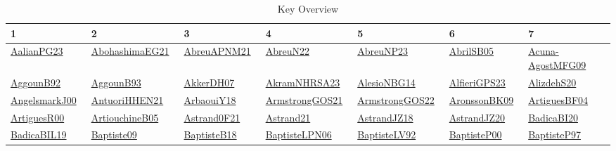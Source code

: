 {\scriptsize
\begin{longtable}{*{7}{l}}
\caption{Key Overview}\\ \toprule
1 & 2 & 3 & 4 & 5 & 6 & 7\\ \midrule
\endhead
\bottomrule
\endfoot
\href{papers/AalianPG23.pdf}{AalianPG23}~\cite{AalianPG23} & \href{articles/AbohashimaEG21.pdf}{AbohashimaEG21}~\cite{AbohashimaEG21} & \href{}{AbreuAPNM21}~\cite{AbreuAPNM21} & \href{articles/AbreuN22.pdf}{AbreuN22}~\cite{AbreuN22} & \href{}{AbreuNP23}~\cite{AbreuNP23} & \href{papers/AbrilSB05.pdf}{AbrilSB05}~\cite{AbrilSB05} & \href{papers/Acuna-AgostMFG09.pdf}{Acuna-AgostMFG09}~\cite{Acuna-AgostMFG09}\\ 
\href{}{AggounB92}~\cite{AggounB92} & \href{articles/AggounB93.pdf}{AggounB93}~\cite{AggounB93} & \href{papers/AkkerDH07.pdf}{AkkerDH07}~\cite{AkkerDH07} & \href{articles/AkramNHRSA23.pdf}{AkramNHRSA23}~\cite{AkramNHRSA23} & \href{papers/AlesioNBG14.pdf}{AlesioNBG14}~\cite{AlesioNBG14} & \href{articles/AlfieriGPS23.pdf}{AlfieriGPS23}~\cite{AlfieriGPS23} & \href{}{AlizdehS20}~\cite{AlizdehS20}\\ 
\href{papers/AngelsmarkJ00.pdf}{AngelsmarkJ00}~\cite{AngelsmarkJ00} & \href{papers/AntuoriHHEN21.pdf}{AntuoriHHEN21}~\cite{AntuoriHHEN21} & \href{papers/ArbaouiY18.pdf}{ArbaouiY18}~\cite{ArbaouiY18} & \href{papers/ArmstrongGOS21.pdf}{ArmstrongGOS21}~\cite{ArmstrongGOS21} & \href{papers/ArmstrongGOS22.pdf}{ArmstrongGOS22}~\cite{ArmstrongGOS22} & \href{papers/AronssonBK09.pdf}{AronssonBK09}~\cite{AronssonBK09} & \href{papers/ArtiguesBF04.pdf}{ArtiguesBF04}~\cite{ArtiguesBF04}\\ 
\href{articles/ArtiguesR00.pdf}{ArtiguesR00}~\cite{ArtiguesR00} & \href{papers/ArtiouchineB05.pdf}{ArtiouchineB05}~\cite{ArtiouchineB05} & \href{papers/Astrand0F21.pdf}{Astrand0F21}~\cite{Astrand0F21} & \href{}{Astrand21}~\cite{Astrand21} & \href{papers/AstrandJZ18.pdf}{AstrandJZ18}~\cite{AstrandJZ18} & \href{articles/AstrandJZ20.pdf}{AstrandJZ20}~\cite{AstrandJZ20} & \href{}{BadicaBI20}~\cite{BadicaBI20}\\ 
\href{papers/BadicaBIL19.pdf}{BadicaBIL19}~\cite{BadicaBIL19} & \href{papers/Baptiste09.pdf}{Baptiste09}~\cite{Baptiste09} & \href{articles/BaptisteB18.pdf}{BaptisteB18}~\cite{BaptisteB18} & \href{}{BaptisteLPN06}~\cite{BaptisteLPN06} & \href{papers/BaptisteLV92.pdf}{BaptisteLV92}~\cite{BaptisteLV92} & \href{articles/BaptisteP00.pdf}{BaptisteP00}~\cite{BaptisteP00} & \href{papers/BaptisteP97.pdf}{BaptisteP97}~\cite{BaptisteP97}\\ 

\end{longtable}}
